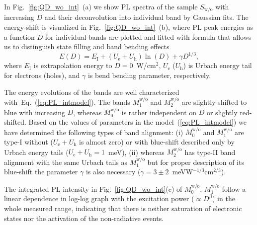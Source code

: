 In Fig.~\ref{fig:QD_wo_int}~(a) we show PL spectra of the sample $S_\mathrm{w/o}$ with increasing $D$ and their deconvolution into individual band by Gaussian fits. The energy-shift is visualized in Fig.~\ref{fig:QD_wo_int}~(b), where PL peak energies as a function $D$ for individual bands are plotted and fitted with %
%
formula that allows us to distinguish state filling and band bending effects~\cite{Abramkin_blueshift_analytical}
%
\begin{equation}
E(D)=E_\mathrm{I}+\left(U_\mathrm{e}+U_\mathrm{h}\right) \ln\left(D \right)+\gamma D^{1/3}, \label{eq:PL_intmodel}
\end{equation}
%
where $E_\mathrm{I}$ is extrapolation energy to $D=0$~W/cm$^2$, $U_\mathrm{e}$ ($U_\mathrm{h}$) is Urbach energy tail for electrons (holes), and $\gamma$ is bend bending parameter, respectively.%

The energy evolutions of the bands are well characterized with~Eq.~(\ref{eq:PL_intmodel}). The bands $M_1^\mathrm{w/o}$ and $M_2^\mathrm{w/o}$ are slightly shifted to blue with increasing $D$, whereas $M_0^\mathrm{w/o}$ is rather independent on $D$ or slightly red-shifted. Based on the values of parameters in the model~(\ref{eq:PL_intmodel}) we have determined the following types of band alignment: (i) $M_0^\mathrm{w/o}$ and $M_1^\mathrm{w/o}$ are type-I without ($U_\mathrm{e}+U_\mathrm{h}$ is almost zero) or with blue-shift described only by Urbach energy tails ($U_\mathrm{e}+U_\mathrm{h}=1$~meV), (ii) whereas $M_2^\mathrm{w/o}$ has type-II band alignment with the same Urbach tails as $M_1^\mathrm{w/o}$ but for proper description of its blue-shift the parameter $\gamma$ is also necessary ($\gamma=3\pm2$~meVW$^{-1/3}$cm$^{2/3}$).


The integrated PL intensity in Fig.~\ref{fig:QD_wo_int}(c) of $M_0^\mathrm{w/o}$, $M_1^\mathrm{w/o}$ follow a linear dependence in log-log graph with the excitation power ($\propto D^\beta$) in the whole measured range, indicating that there is neither saturation of electronic states nor the activation of the non-radiative events.{}

